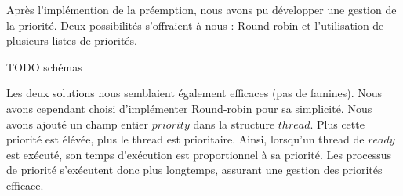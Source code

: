 Après l'implémention de la préemption, nous avons pu développer une gestion de la priorité. Deux possibilités s'offraient à nous : Round-robin et l'utilisation de plusieurs listes de priorités. 

TODO   schémas

Les deux solutions nous semblaient également efficaces (pas de famines). Nous avons cependant choisi d'implémenter Round-robin pour sa simplicité. Nous avons ajouté un champ entier $priority$ dans la structure $thread$. Plus cette priorité est élévée, plus le thread est prioritaire. Ainsi, lorsqu'un thread de $ready$ est exécuté, son temps d'exécution est proportionnel à sa priorité. Les processus de priorité s'exécutent donc plus longtemps, assurant une gestion des priorités efficace.